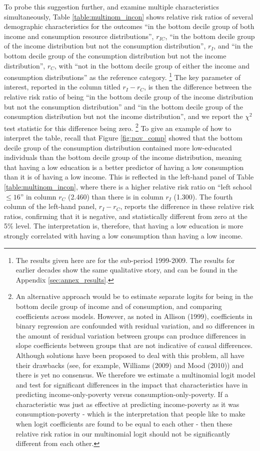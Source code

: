 To probe this suggestion further, and examine multiple characteristics simultaneously, Table \ref{table:multinom_incon} shows relative risk ratios of several demographic characteristics for the outcomes ``in the bottom decile group of both income and consumption resource distributions'', $r_{IC}$, ``in the bottom decile group of the income distribution but not the consumption distribution'', $r_{I}$, and ``in the bottom decile group of the consumption distribution but not the income distribution'', $r_{C}$, with ``not in the bottom decile group of either the income and consumption distributions'' as the reference category. \footnote{The results given here are for the sub-period 1999-2009. The results for earlier decades show the same qualitative story, and can be found in the Appendix \ref{sec:annex_results}.} The key parameter of interest, reported in the column titled $r_{I}-r_{C}$, is then the difference between the relative risk ratio of being ``in the bottom decile group of the income distribution but not the consumption distribution'' and ``in the bottom decile group of the consumption distribution but not the income distribution'', and we report the $\chi^{2}$ test statistic for this difference being zero. \footnote{An alternative approach would be to estimate separate logits for being in the bottom decile group of income and of consumption, and comparing coefficients across models. However, as noted in Allison (1999), coefficients in binary regression are confounded with residual variation, and so differences in the amount of residual variation between groups can produce differences in slope coefficients between groups that are not indicative of causal differences. Although solutions have been proposed to deal with this problem, all have their drawbacks (see, for example, Williams (2009) and Mood (2010)) and there is yet no consensus. We therefore we estimate a multinomial logit model and test for significant differences in the impact that characteristics have in predicting income-only-poverty versus consumption-only-poverty. If a characteristic was just as effective at predicting income-poverty as it was consumption-poverty - which is the interpretation that people like to make when logit coefficients are found to be equal to each other - then these relative risk ratios in our multinomial logit should not be significantly different from each other.} To give an example of how to interpret the table, recall that Figure \ref{fig:pov_comp} showed that the bottom decile group of the consumption distribution contained more low-educated individuals than the bottom decile group of the income distribution, meaning that having a low education is a better predictor of having a low consumption than it is of having a low income. This is reflected in the left-hand panel of Table \ref{table:multinom_incon}, where there is a higher relative risk ratio on ``left school $\leq16$'' in column $r_{C}$ (2.460) than there is in column $r_{I}$ (1.300). The fourth column of the left-hand panel, $r_{I}-r_{C}$, reports the difference in these relative risk ratios, confirming that it is negative, and statistically different from zero at the 5\% level. The interpretation is, therefore, that  having a low education is more strongly correlated with having a low consumption than having a low income. 

